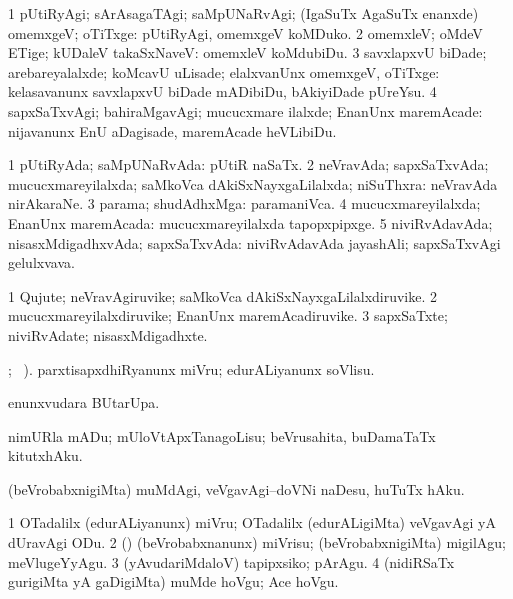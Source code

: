 \bentry
{}
\gl{\kirxvi}
\bmng
\bnum
\num{1} pUtiRyAgi; sArAsagaTAgi; saMpUNaRvAgi; (IgaSuTx AgaSuTx enanxde) omemxgeV; oTiTxge:  pUtiRyAgi, omemxgeV koMDuko. 
\num{2} omemxleV; oMdeV ETige; kUDaleV takaSxNaveV:  omemxleV koMdubiDu. 
\num{3} savxlapxvU biDade; arebareyalalxde; koMcavU uLisade; elalxvanUnx omemxgeV, oTiTxge:  kelasavanunx savxlapxvU biDade mADibiDu, bAkiyiDade pUreYsu. 
\num{4} sapxSaTxvAgi; bahiraMgavAgi; mucucxmare ilalxde; EnanUnx maremAcade:  nijavanunx EnU aDagisade, maremAcade heVLibiDu. 
\enum
\emng
\eentry

\bentry
{}
\gl{\gu}
\bmng
\bnum
\num{1} pUtiRyAda; saMpUNaRvAda:  pUtiR naSaTx.
\num{2} neVravAda; sapxSaTxvAda; mucucxmareyilalxda; saMkoVca dAkiSxNayxgaLilalxda; niSuThxra:  neVravAda nirAkaraNe. 
\num{3} parama; shudAdhxMga:  paramaniVca. 
\num{4} mucucxmareyilalxda; EnanUnx maremAcada:  mucucxmareyilalxda tapopxpipxge. 
\num{5} niviRvAdavAda; nisasxMdigadhxvAda; sapxSaTxvAda:  niviRvAdavAda jayashAli; sapxSaTxvAgi gelulxvava. 
\enum
\emng
\eentry

\bentry
{}
\gl{\nA}
\bmng
\bnum
\num{1} Qujute; neVravAgiruvike; saMkoVca dAkiSxNayxgaLilalxdiruvike.
\num{2} mucucxmareyilalxdiruvike; EnanUnx maremAcadiruvike. 
\num{3} sapxSaTxte; niviRvAdate; nisasxMdigadhxte. 
\enum
\emng
\eentry

\bentry
{}
\gl{\sakirx}
; \ame\ ).\bmng
parxtisapxdhiRyanunx miVru; edurALiyanunx soVlisu. 
\emng
\eentry

\bentry
{}
\gl{\kirx}
\bmng
{} enunxvudara BUtarUpa. 
\emng
\eentry

\bentry
{}
\gl{\sakirx}
\bmng
nimURla mADu; mUloVtApxTanagoLisu; beVrusahita, buDamaTaTx kitutxhAku. 
\emng
\eentry

\bentry
{}
\gl{\sakirx}
\bmng
(beVrobabxnigiMta) muMdAgi, veVgavAgi--doVNi naDesu, huTuTx hAku. 
\emng
\eentry

\bentry
{}
\gl{\sakirx}
\bmng
\bnum
\num{1} OTadalilx (edurALiyanunx) miVru; OTadalilx (edurALigiMta) veVgavAgi yA dUravAgi ODu. 
\num{2} (\rUpa) (beVrobabxnanunx) miVrisu; (beVrobabxnigiMta) migilAgu; meVlugeYyAgu. 
\num{3} (yAvudariMdaloV) tapipxsiko; pArAgu. 
\num{4} (nidiRSaTx gurigiMta yA gaDigiMta) muMde hoVgu; Ace hoVgu. 
\enum
\emng
\eentry

